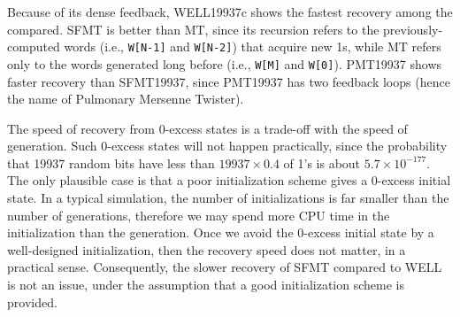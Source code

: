 \documentclass{svmult}
\begin{document}
Because of its dense feedback, WELL19937c shows
the fastest recovery among the compared. 
SFMT is better than MT, since its recursion refers to 
the previously-computed words (i.e., {\tt W[N-1]} and {\tt W[N-2]}) 
that acquire new 1s, while
MT refers only to the words generated long before 
(i.e., {\tt W[M]} and {\tt W[0]}). PMT19937 shows faster recovery 
than SFMT19937, since PMT19937 has two feedback loops
(hence the name of Pulmonary Mersenne Twister).

The speed of recovery from 0-excess states 
is a trade-off 
with the speed of generation. 
Such 0-excess states will not happen practically, 
since the probability 
that 19937 random bits have less than $19937\times 0.4$ of 1's 
is about $5.7\times 10^{-177}$.
The only plausible case is that
a poor initialization scheme gives a 0-excess initial state. 
In a typical simulation, the number of 
initializations is far smaller than the number of generations,
therefore we may spend more CPU time in the initialization
than the generation. Once we avoid the 0-excess initial state
by a well-designed initialization, then the recovery 
speed does not matter, in a practical sense. 
Consequently, the slower recovery of SFMT compared to WELL 
is not an issue, under the assumption that
a good initialization scheme is provided. 
\end{document}

